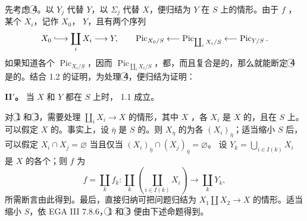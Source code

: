 先考虑 \textcircled{4}。以 $Y_j$ 代替 $Y$，以 $\Sigma_j$ 代替 $X$，便归结为 $Y$ 在 $S$ 上的情形。由于 $f$ ，某个 $X_i$，记作 $X_0$， $Y$，且有两个序列
\[
X_0\lhook\joinrel\longrightarrow\coprod_iX_i\longrightarrow Y,
\qquad
\operatorname{Pic}_{X_0/S}\longleftarrow
\operatorname{Pic}_{\coprod_iX_i/S}\longleftarrow\operatorname{Pic}_{Y/S}.
\]
如果知道各个 $\operatorname{Pic}_{X_i/S}$，因而 $\operatorname{Pic}_{\coprod_iX_i/S}$，都，而且复合是的，那么就能断定 \textcircled{4} 是的。结合 1.2 的证明，为处理 \textcircled{4}，便归结为证明：

\textbf{II$'$。} 当 $X$ 和 $Y$ 都在 $S$ 上时， 1.1 成立。

对 \textcircled{1} 和 \textcircled{3}，需要处理 $\coprod_iX_i\to X$ 的情形，其中 $X$ ，各 $X_i$ 是 $X$ 的，且在 $S$ 上。可以假定 $X$ 的。事实上，设 $\bar\eta$ 是 $S$ 的。则 $X_{\bar\eta}$ 的为各 $(X_i)_{\bar\eta}$；适当缩小 $S$ 后，可以假定 $X_i\cap X_j=\varnothing$ 当且仅当 $(X_i)_{\bar\eta}\cap(X_j)_{\bar\eta}=\varnothing$。
设 $Y_k=\bigcup_{i\in I(k)}X_i$ 是 $X$ 的各个；则 $f$ 为
\[
f=\coprod_k f_k:\coprod_k\left(\coprod_{i\in I(k)}X_i\right)\longrightarrow\coprod_kY_k,
\]
所需断言由此得到。最后，直接归纳可把问题归结为 $X_1\amalg X_2\to X$ 的情形。适当缩小 $S$，依 EGA III 7.8.6，\textcircled{1} 和 \textcircled{3} 便由下述命题得到。

